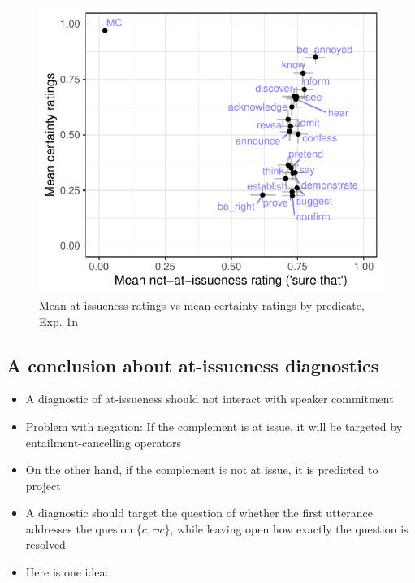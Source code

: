 \documentclass[11pt]{article}
\begin{document}
			\begin{figure}[h]
					\centering
					\includegraphics[scale=0.9]{figures/n1-correl.pdf}
					\caption{Mean at-issueness ratings vs mean certainty ratings by predicate, Exp. 1n \label{fig:1n-correl}}
				\end{figure}


	\pagebreak
	\subsection{A conclusion about at-issueness diagnostics} %
		\begin{itemize}
			\item A diagnostic of at-issueness should not interact with speaker commitment
			\item Problem with negation: If the complement is at issue, it will be targeted by entailment-cancelling operators
			\item On the other hand, if the complement is not at issue, it is predicted to project
			\item A diagnostic should target the question of whether the first utterance addresses the quesion $\{c, \neg c\}$, while leaving open how exactly the question is resolved

			\item Here is one idea:
		\end{itemize}
	
\end{document}
